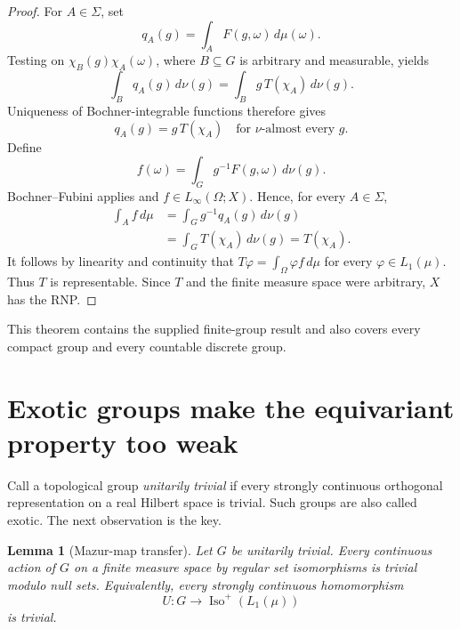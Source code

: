 \documentclass[11pt]{article}
\newtheorem{lemma}[theorem]{Lemma}
\theoremstyle{remark}
\newcommand{\Iso}{\operatorname{Iso}}
\begin{document}
\begin{proof}
For $A\in\Sigma$, set
\[
 q_A(g)=\int_A F(g,\omega)\,d\mu(\omega).
\]
Testing on $\chi_B(g)\chi_A(\omega)$, where $B\subseteq G$ is arbitrary and
measurable, yields
\[
 \int_Bq_A(g)\,d\nu(g)
 =\int_Bg\,T(\chi_A)\,d\nu(g).
\]
Uniqueness of Bochner-integrable functions therefore gives
\[
 q_A(g)=g\,T(\chi_A)
 \quad\text{for $\nu$-almost every }g.
\]
Define
\[
 f(\omega)=\int_Gg^{-1}F(g,\omega)\,d\nu(g).
\]
Bochner--Fubini applies and $f\in L_\infty(\Omega;X)$.  Hence, for every
$A\in\Sigma$,
\begin{align*}
 \int_Af\,d\mu
 &=\int_Gg^{-1}q_A(g)\,d\nu(g)\\
 &=\int_GT(\chi_A)\,d\nu(g)
 =T(\chi_A).
\end{align*}
It follows by linearity and continuity that
$T\varphi=\int_\Omega\varphi f\,d\mu$ for every
$\varphi\in L_1(\mu)$.  Thus $T$ is representable.  Since $T$ and the finite
measure space were arbitrary, $X$ has the RNP.
\end{proof}

This theorem contains the supplied finite-group result and also covers every
compact group and every countable discrete group.

\section{Exotic groups make the equivariant property too weak}

Call a topological group \emph{unitarily trivial} if every strongly
continuous orthogonal representation on a real Hilbert space is trivial.
Such groups are also called exotic.  The next observation is the key.

\begin{lemma}[Mazur-map transfer]\label{lem:mazur}
Let $G$ be unitarily trivial.  Every continuous action of $G$ on a finite
measure space by regular set isomorphisms is trivial modulo null sets.
Equivalently, every strongly continuous homomorphism
\[
 U:G\longrightarrow\Iso^+(L_1(\mu))
\]
is trivial.
\end{lemma}
\end{document}
